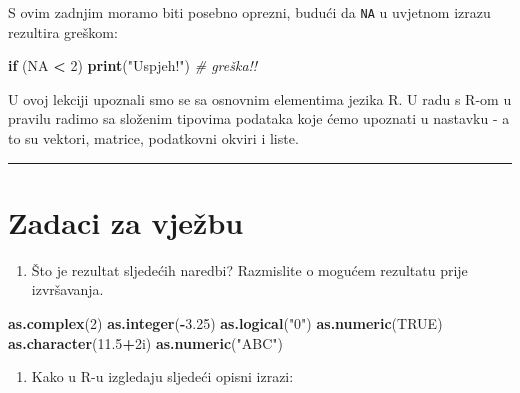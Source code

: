 \documentclass[]{book}
\newenvironment{Shaded}{\begin{snugshade}}{\end{snugshade}}
\newcommand{\KeywordTok}[1]{\textcolor[rgb]{0.13,0.29,0.53}{\textbf{#1}}}
\newcommand{\DecValTok}[1]{\textcolor[rgb]{0.00,0.00,0.81}{#1}}
\newcommand{\FloatTok}[1]{\textcolor[rgb]{0.00,0.00,0.81}{#1}}
\newcommand{\StringTok}[1]{\textcolor[rgb]{0.31,0.60,0.02}{#1}}
\newcommand{\CommentTok}[1]{\textcolor[rgb]{0.56,0.35,0.01}{\textit{#1}}}
\newcommand{\OtherTok}[1]{\textcolor[rgb]{0.56,0.35,0.01}{#1}}
\newcommand{\ControlFlowTok}[1]{\textcolor[rgb]{0.13,0.29,0.53}{\textbf{#1}}}
\newcommand{\OperatorTok}[1]{\textcolor[rgb]{0.81,0.36,0.00}{\textbf{#1}}}
\newcommand{\NormalTok}[1]{#1}
\providecommand{\tightlist}{%
  \setlength{\itemsep}{0pt}\setlength{\parskip}{0pt}}
\theoremstyle{definition}
\theoremstyle{definition}
\theoremstyle{definition}
\theoremstyle{remark}
\begin{document}
S ovim zadnjim moramo biti posebno oprezni, budući da \texttt{NA} u
uvjetnom izrazu rezultira greškom:

\begin{Shaded}
\begin{Highlighting}[]
\ControlFlowTok{if}\NormalTok{ (}\OtherTok{NA} \OperatorTok{<}\StringTok{ }\DecValTok{2}\NormalTok{) }\KeywordTok{print}\NormalTok{(}\StringTok{"Uspjeh!"}\NormalTok{)  }\CommentTok{# greška!!}
\end{Highlighting}
\end{Shaded}

U ovoj lekciji upoznali smo se sa osnovnim elementima jezika R. U radu s
R-om u pravilu radimo sa složenim tipovima podataka koje ćemo upoznati u
nastavku - a to su vektori, matrice, podatkovni okviri i liste.

\begin{center}\rule{0.5\linewidth}{\linethickness}\end{center}

\section*{Zadaci za vježbu}\label{zadaci-za-vjezbu}

\begin{enumerate}
\def\labelenumi{\arabic{enumi}.}
\tightlist
\item
  Što je rezultat sljedećih naredbi? Razmislite o mogućem rezultatu
  prije izvršavanja.
\end{enumerate}

\begin{Shaded}
\begin{Highlighting}[]
\KeywordTok{as.complex}\NormalTok{(}\DecValTok{2}\NormalTok{)}
\KeywordTok{as.integer}\NormalTok{(}\OperatorTok{-}\FloatTok{3.25}\NormalTok{)}
\KeywordTok{as.logical}\NormalTok{(}\StringTok{"0"}\NormalTok{)}
\KeywordTok{as.numeric}\NormalTok{(}\OtherTok{TRUE}\NormalTok{)}
\KeywordTok{as.character}\NormalTok{(}\FloatTok{11.5}\OperatorTok{+}\NormalTok{2i)}
\KeywordTok{as.numeric}\NormalTok{(}\StringTok{"ABC"}\NormalTok{)}
\end{Highlighting}
\end{Shaded}

\begin{enumerate}
\def\labelenumi{\arabic{enumi}.}
\setcounter{enumi}{1}
\tightlist
\item
  Kako u R-u izgledaju sljedeći opisni izrazi:
\end{enumerate}
\end{document}
